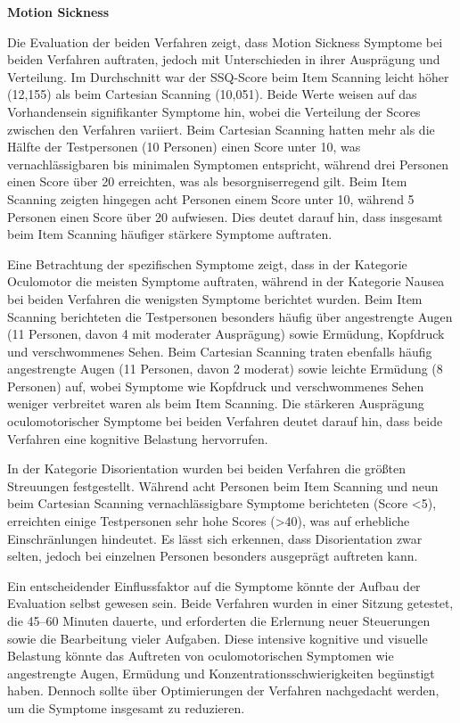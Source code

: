 \textbf{Motion Sickness}

Die Evaluation der beiden Verfahren zeigt, dass Motion Sickness Symptome bei beiden Verfahren auftraten, jedoch mit Unterschieden in ihrer Ausprägung und Verteilung. Im Durchschnitt war der SSQ-Score beim Item Scanning leicht höher (12,155) als beim Cartesian Scanning (10,051). Beide Werte weisen auf das Vorhandensein signifikanter Symptome hin, wobei die Verteilung der Scores zwischen den Verfahren variiert. Beim Cartesian Scanning hatten mehr als die Hälfte der Testpersonen (10 Personen) einen Score unter 10, was vernachlässigbaren bis minimalen Symptomen entspricht, während drei Personen einen Score über 20 erreichten, was als besorgniserregend gilt. Beim Item Scanning zeigten hingegen acht Personen einem Score unter 10, während 5 Personen einen Score über 20 aufwiesen. Dies deutet darauf hin, dass insgesamt beim Item Scanning häufiger stärkere Symptome auftraten.

Eine Betrachtung der spezifischen Symptome zeigt, dass in der Kategorie Oculomotor die meisten Symptome auftraten, während in der Kategorie Nausea bei beiden Verfahren die wenigsten Symptome berichtet wurden. Beim Item Scanning berichteten die Testpersonen besonders häufig über angestrengte Augen (11 Personen, davon 4 mit moderater Ausprägung) sowie Ermüdung, Kopfdruck und verschwommenes Sehen. Beim Cartesian Scanning traten ebenfalls häufig angestrengte Augen (11 Personen, davon 2 moderat) sowie leichte Ermüdung (8 Personen) auf, wobei Symptome wie Kopfdruck und verschwommenes Sehen weniger verbreitet waren als beim Item Scanning. Die stärkeren Ausprägung oculomotorischer Symptome bei beiden Verfahren deutet darauf hin, dass beide Verfahren eine kognitive Belastung hervorrufen. 

In der Kategorie Disorientation wurden bei beiden Verfahren die größten Streuungen festgestellt. Während acht Personen beim Item Scanning und neun beim Cartesian Scanning vernachlässigbare Symptome berichteten (Score <5), erreichten einige Testpersonen sehr hohe Scores (>40), was auf erhebliche Einschränlungen hindeutet. Es lässt sich erkennen, dass Disorientation zwar selten, jedoch bei einzelnen Personen besonders ausgeprägt auftreten kann.

Ein entscheidender Einflussfaktor auf die Symptome könnte der Aufbau der Evaluation selbst gewesen sein. Beide Verfahren wurden in einer Sitzung getestet, die 45–60 Minuten dauerte, und erforderten die Erlernung neuer Steuerungen sowie die Bearbeitung vieler Aufgaben. Diese intensive kognitive und visuelle Belastung könnte das Auftreten von oculomotorischen Symptomen wie angestrengte Augen, Ermüdung und Konzentrationsschwierigkeiten begünstigt haben. Dennoch sollte über Optimierungen der Verfahren nachgedacht werden, um die Symptome insgesamt zu reduzieren.

